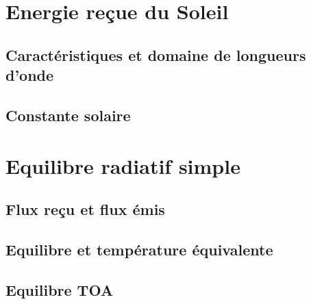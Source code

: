 \documentclass[a4paper,DIV16,10pt]{scrartcl}
\begin{document}
 \inidoc


\mk \section{Energie reçue du Soleil}
	\sk \subsection{Caractéristiques et domaine de longueurs d'onde}
		
	\sk \subsection{Constante solaire}
		
		

\mk \section{Equilibre radiatif simple}
	\sk \subsection{Flux reçu et flux émis}
		
	\sk \subsection{Equilibre et température équivalente}
		
		
	\sk \subsection{Equilibre TOA}
		
\end{document}
